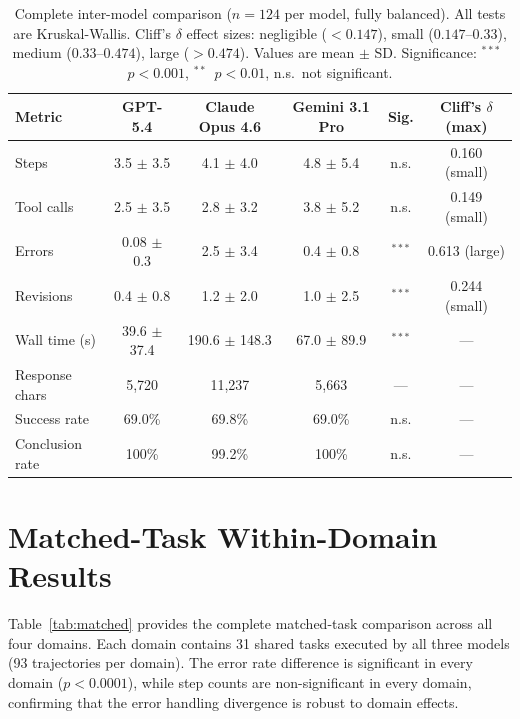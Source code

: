 \documentclass{article}
\begin{document}
\begin{table}[h]
\caption{Complete inter-model comparison ($n=124$ per model, fully balanced). All tests are Kruskal-Wallis. Cliff's $\delta$ effect sizes: negligible ($<0.147$), small ($0.147$--$0.33$), medium ($0.33$--$0.474$), large ($>0.474$). Values are mean $\pm$ SD. Significance: $^{***}$~$p<0.001$, $^{**}$~$p<0.01$, n.s.~not significant.}
\label{tab:model_detailed}
\centering
\small
\begin{tabular}{lccccc}
\toprule
\textbf{Metric} & \textbf{GPT-5.4} & \textbf{Claude Opus 4.6} & \textbf{Gemini 3.1 Pro} & \textbf{Sig.} & \textbf{Cliff's $\delta$ (max)} \\
\midrule
Steps & 3.5 $\pm$ 3.5 & 4.1 $\pm$ 4.0 & 4.8 $\pm$ 5.4 & n.s. & 0.160 (small) \\
Tool calls & 2.5 $\pm$ 3.5 & 2.8 $\pm$ 3.2 & 3.8 $\pm$ 5.2 & n.s. & 0.149 (small) \\
Errors & 0.08 $\pm$ 0.3 & 2.5 $\pm$ 3.4 & 0.4 $\pm$ 0.8 & $^{***}$ & 0.613 (large) \\
Revisions & 0.4 $\pm$ 0.8 & 1.2 $\pm$ 2.0 & 1.0 $\pm$ 2.5 & $^{***}$ & 0.244 (small) \\
Wall time (s) & 39.6 $\pm$ 37.4 & 190.6 $\pm$ 148.3 & 67.0 $\pm$ 89.9 & $^{***}$ & --- \\
Response chars & 5,720 & 11,237 & 5,663 & --- & --- \\
Success rate & 69.0\% & 69.8\% & 69.0\% & n.s. & --- \\
Conclusion rate & 100\% & 99.2\% & 100\% & n.s. & --- \\
\bottomrule
\end{tabular}
\end{table}

\section{Matched-Task Within-Domain Results}
\label{app:matched}

Table~\ref{tab:matched} provides the complete matched-task comparison across all four domains. Each domain contains 31 shared tasks executed by all three models (93 trajectories per domain). The error rate difference is significant in every domain ($p<0.0001$), while step counts are non-significant in every domain, confirming that the error handling divergence is robust to domain effects.
\end{document}
